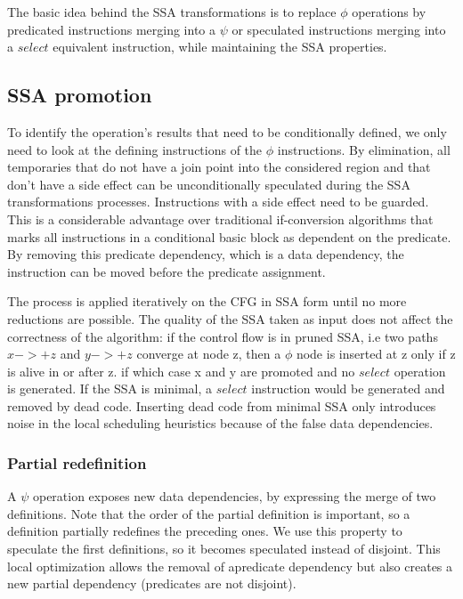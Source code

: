 The basic idea behind the SSA transformations is to replace $\phi$ operations by predicated instructions merging into a $\psi$ or speculated instructions merging into a $select$ equivalent instruction, while maintaining the SSA properties.

\subsection{SSA promotion}

To identify the operation's results that need to be conditionally defined, we only need to look at the defining instructions of the $\phi$ instructions. By elimination, all temporaries that do not have a join point into the considered region and that don't have a side effect can be unconditionally speculated during the SSA transformations processes. Instructions with a side effect need to be guarded. This is a considerable advantage over traditional if-conversion algorithms that marks all instructions in a conditional basic block as dependent on the predicate. By removing this predicate dependency, which is a data dependency, the instruction can be moved before the predicate assignment.

The process is applied iteratively on the CFG in SSA form until no more reductions are possible. The quality of the SSA taken as input does not affect the correctness of the algorithm: if the control flow is in pruned SSA, i.e two paths $x->+z$ and $y->+z$ converge at node z, then a $\phi$ node is inserted at z only if z is alive in or after z. if which case x and y are promoted and no $select$ operation is generated. If the SSA is minimal, a $select$ instruction would be generated and removed by dead code. Inserting dead code from minimal SSA only introduces noise in the local scheduling heuristics because of the false data dependencies.

\subsubsection{Partial redefinition}

A $\psi$ operation exposes new data dependencies, by expressing the merge of two definitions. Note that the order of the partial definition is important, so a definition partially redefines the preceding ones. We use this property to speculate the first definitions, so it becomes speculated instead of disjoint. This local optimization allows the removal of apredicate dependency but also creates a new partial dependency (predicates are not disjoint). 

